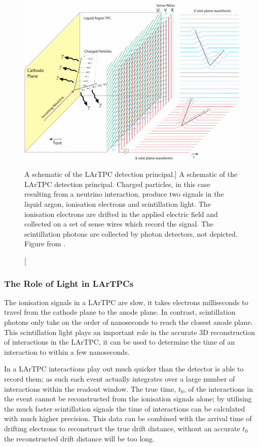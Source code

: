 \begin{figure}

	\centering

	\includegraphics[width=\textwidth]{figures/LArTPC_Concept.pdf}

	\caption
	[A schematic of the LArTPC detection principal.]
	{A schematic of the LArTPC detection principal. Charged particles, in this
	case resulting from a neutrino interaction, produce two signals in the liquid
	argon, ionisation electrons and scintillation light. The ionisation electrons
	are drifted in the applied electric field and collected on a set of sense
	wires which record the signal. The scintillation photons are collected by 
	photon detectors, not depicted. Figure from \cite{Abi:2020loh}.}

	\label{fig:lartpc}

\end{figure}

\subsubsection*{The Role of Light in LArTPCs}

The ionisation signals in a LArTPC are slow, it takes electrons milliseconds to
travel from the cathode plane to the anode plane. In contrast, scintillation 
photons only take on the order of nanoseconds to reach the closest anode 
plane. This scintillation light plays an important role in the accurate 3D 
reconstruction of interactions in the LArTPC, it can be used to determine the
time of an interaction to within a few nanoseconds.

In a LArTPC interactions play out much quicker than the detector is able to 
record them; as such each event actually integrates over a large number of 
interactions within the readout window. The true time, $t_0$, of the 
interactions in the event cannot be reconstructed from the ionisation signals 
alone; by utilising the much faster scintillation signals the time of 
interactions can be calculated with much higher precision.  This data can be 
combined with the arrival time of drifting electrons to reconstruct the true 
drift distance, without an accurate $t_0$ the reconstructed drift distance 
will be too long.

